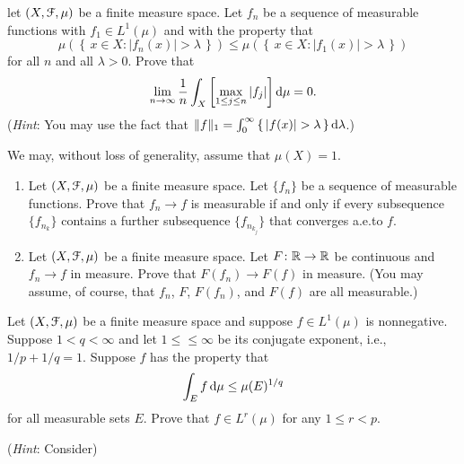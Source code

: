 \begin{problem}
let $(X,\mathcal{F},\mu)$ be a finite measure space. Let $f_n$ be a sequence of
measurable functions with $f_1\in L^1(\mu)$ and with the property that
\[
\mu\left(\left\{\,x\in X:|f_n(x)|>\lambda\,\right\}\right)
\leq
\mu\left(\left\{\,x\in X:|f_1(x)|>\lambda\,\right\}\right)
\]
for all $n$ and all $\lambda>0$. Prove that
\[
\lim_{n\to\infty}\frac{1}{n}\int_X\left[\max_{1\leq j\leq n}|f_j|\right]\mathop{}\!\mathrm{d}\mu=0.
\]
(\emph{Hint}: You may use the fact that
$\|f\|_1=\int_0^\infty\left\{\,|f(x)|>\lambda\,\right\}\diff\lambda$.)
\end{problem}
\begin{solution}
  We may, without loss of generality, assume that $\mu(X)=1$.
\end{solution}

\begin{problem}
\begin{enumerate}[label=(\roman*)]
\item Let $(X,\mathcal{F},\mu)$ be a finite measure space. Let $\{f_n\}$ be a sequence
of measurable functions. Prove that $f_n\to f$ is measurable if and only if
every subsequence $\{f_{n_k}\}$ contains a further subsequence
$\{f_{n_{k_j}}\}$ that converges a.e.\@ to $f$.
\item Let $(X,\mathcal{F},\mu)$ be a finite measure space. Let
$F\colon\mathbb{R}\to\mathbb{R}$ be continuous and $f_n\to f$ in measure. Prove that
$F(f_n)\to F(f)$ in measure. (You may assume, of course, that $f_n$, $F$,
$F(f_n)$, and $F(f)$ are all measurable.)
\end{enumerate}
\end{problem}
\begin{solution}
\end{solution}

\begin{problem}
Let $(X,\mathcal{F},\mu)$ be a finite measure space and suppose $f\in L^1(\mu)$
is nonnegative. Suppose $1<q<\infty$ and let $1\leq \leq\infty$ be its
conjugate exponent, i.e., $1/p+1/q=1$. Suppose $f$ has the property that
\[
\int_Ef\mathop{}\!\mathrm{d}\mu\leq \mu(E)^{1/q}
\]
for all measurable sets $E$. Prove that $f\in L^r(\mu)$ for any $1\leq
r<p$.

(\emph{Hint}: Consider)
\end{problem}
\begin{solution}
\end{solution}

